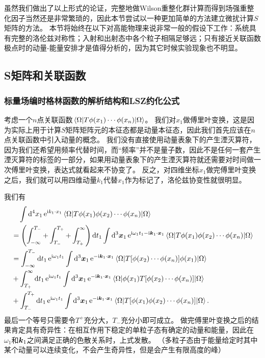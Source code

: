 \documentclass[hyperref, UTF8, a4paper]{ctexart}
\newcommand*{\ii}{\mathrm{i}}
\newcommand*{\ee}{\mathrm{e}}
\begin{document}
虽然我们做出了以上形式的论证，完整地做Wilson重整化群计算而得到场强重整化因子当然还是非常繁琐的，因此本节尝试以一种更加简单的方法建立微扰计算$S$矩阵的方法。
本节将始终在以下对高能物理来说非常一般的假设下工作：系统具有完整的洛伦兹对称性；入射和出射态中各个粒子相隔足够远；只有接近关联函数极点时的动量-能量安排才是值得分析的，因为其它时候实验现象也不明显。

\subsection{S矩阵和关联函数}

\subsubsection{标量场编时格林函数的解析结构和LSZ约化公式}

考虑一个$n$点关联函数$\mel{\Omega}{T \phi(x_1) \cdots \phi(x_n)}{\Omega}$。
我们对$x_1$做傅里叶变换，这是因为实际上用于计算$S$矩阵矩阵元的本征态都是动量本征态，因此我们首先应该在$n$点关联函数中引入动量的概念。
我们没有直接使用动量表象下的产生湮灭算符，因为我们还希望用频率代替时间，而“频率”并不是量子数，因此不是任何一套产生湮灭算符的标签的一部分，如果用动量表象下的产生湮灭算符就还需要对时间做一次傅里叶变换，表达式就看起来不协变了。
反之，对四维坐标$x_1$做完傅里叶变换之后，我们就可以用四维动量$k_1$代替$x_1$作为标记了，洛伦兹协变性就很明显。

我们有
\begin{equation}
    \begin{aligned}
        &\quad \int \dd[4]{x_1} \ee^{\ii k_1 \cdot x_1} \mel{\Omega}{T \phi(x_1) \phi(x_2) \cdots \phi(x_n)}{\Omega} \\
        &= \left( \int_{-\infty}^{T_-} + \int_{T_-}^{T_+} + \int_{T_+}^\infty \right) \dd{t_1} \int \dd[3]{\vb*{x}_1} \ee^{\ii \omega_1 t_1 - \ii \vb*{k}_1 \cdot \vb*{x}_1} \mel{\Omega}{T \phi(x_1) \phi(x_2) \cdots \phi(x_n)}{\Omega} \\
        &= \int_{-\infty}^{T_-} \dd{t_1} \ee^{\ii \omega_1 t_1} \int \dd[3]{\vb*{x}_1} \ee^{- \ii \vb*{k}_1 \cdot \vb*{x}_1} \mel{\Omega}{T [\phi(x_2) \cdots \phi(x_n)] \phi(x_1)}{\Omega} \\
        &+ \int_{T_+}^{\infty} \dd{t_1} \ee^{\ii \omega_1 t_1} \int \dd[3]{\vb*{x}_1} \ee^{- \ii \vb*{k}_1 \cdot \vb*{x}_1} \mel{\Omega}{\phi(x_1) T [\phi(x_2) \cdots \phi(x_n)]}{\Omega} \\
        &+ \int_{T_-}^{T_+} \dd{t_1} \ee^{\ii \omega_1 t_1} \int \dd[3]{\vb*{x}_1} \ee^{- \ii \vb*{k}_1 \cdot \vb*{x}_1} \mel{\Omega}{T [\phi(x_1) \phi(x_2) \cdots \phi(x_n)]}{\Omega}.
    \end{aligned}
    \label{eq:correlation-after-fourier}
\end{equation}
最后一个等号只需要令$T^+$充分大，$T_-$充分小即可成立。
做完傅里叶变换之后的结果肯定具有奇异性：在相互作用下稳定的单粒子态有确定的动量和能量，因此在$\omega_1$和$\vb*{k}_1$之间满足正确的色散关系时，上式发散。
（多粒子态由于能量给定时其中某个动量可以连续变化，不会产生奇异性，但是会产生有限高度的峰）
\end{document}

